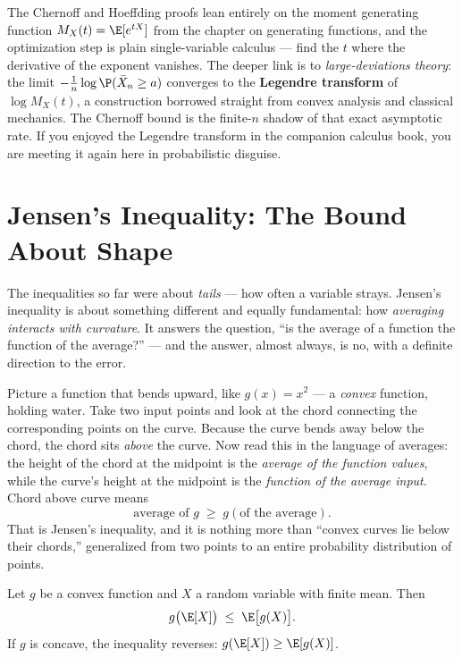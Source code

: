 \begin{connectionbox}
The Chernoff and Hoeffding proofs lean entirely on the moment generating
function $M_X(t) = \E[e^{tX}]$ from the chapter on generating functions, and
the optimization step is plain single-variable calculus --- find the $t$ where
the derivative of the exponent vanishes. The deeper link is to
\emph{large-deviations theory}: the limit $-\frac1n \log \P(\bar X_n \ge a)$
converges to the \textbf{Legendre transform} of $\log M_X(t)$, a construction
borrowed straight from convex analysis and classical mechanics. The Chernoff
bound is the finite-$n$ shadow of that exact asymptotic rate. If you enjoyed
the Legendre transform in the companion calculus book, you are meeting it
again here in probabilistic disguise.
\end{connectionbox}

\section{Jensen's Inequality: The Bound About Shape}
\label{ch19:jensen}

The inequalities so far were about \emph{tails} --- how often a variable
strays. Jensen's inequality is about something different and equally
fundamental: how \emph{averaging interacts with curvature}. It answers the
question, ``is the average of a function the function of the average?'' ---
and the answer, almost always, is no, with a definite direction to the error.

\begin{intuitionbox}
Picture a function that bends upward, like $g(x) = x^2$ --- a \emph{convex}
function, holding water. Take two input points and look at the chord
connecting the corresponding points on the curve. Because the curve bends away
below the chord, the chord sits \emph{above} the curve. Now read this in the
language of averages: the height of the chord at the midpoint is the
\emph{average of the function values}, while the curve's height at the midpoint
is the \emph{function of the average input}. Chord above curve means
\[
  \text{average of } g \;\ge\; g(\text{of the average}).
\]
That is Jensen's inequality, and it is nothing more than ``convex curves lie
below their chords,'' generalized from two points to an entire probability
distribution of points.
\end{intuitionbox}

\begin{theorem}
\label{ch19:jensen-thm}
Let $g$ be a convex function and $X$ a random variable with finite mean. Then
\[
  g\bigl(\E[X]\bigr) \;\le\; \E\bigl[g(X)\bigr].
\]
If $g$ is concave, the inequality reverses:
$g(\E[X]) \ge \E[g(X)]$.
\end{theorem}

